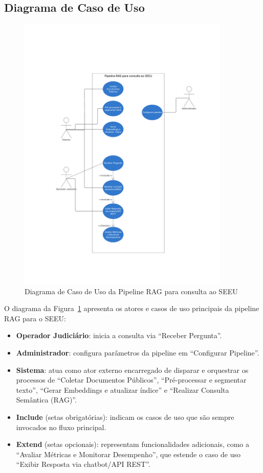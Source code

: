 \begin{description}
\section{Diagrama de Caso de Uso}
\label{sec:diagrama-caso-uso}

\begin{figure}[H]
  \centering
  \includegraphics[width=0.9\textwidth]{04-figuras/diagrama_em_branco.pdf}
  \caption{Diagrama de Caso de Uso da Pipeline RAG para consulta ao SEEU}
  \label{fig:diagrama-rag-seeu}
\end{figure}

\noindent
O diagrama da Figura~\ref{fig:diagrama-rag-seeu} apresenta os atores e casos de uso principais da pipeline RAG para o SEEU:  
\begin{itemize}
  \item \textbf{Operador Judiciário}: inicia a consulta via “Receber Pergunta”.  
  \item \textbf{Administrador}: configura parâmetros da pipeline em “Configurar Pipeline”.  
  \item \textbf{Sistema}: atua como ator externo encarregado de disparar e orquestrar os processos de “Coletar Documentos Públicos”, “Pré-processar e segmentar texto”, “Gerar Embeddings e atualizar índice” e “Realizar Consulta Semântica (RAG)”.  
  \item \textbf{Include} (setas obrigatórias): indicam os casos de uso que são sempre invocados no fluxo principal.  
  \item \textbf{Extend} (setas opcionais): representam funcionalidades adicionais, como a “Avaliar Métricas e Monitorar Desempenho”, que estende o caso de uso “Exibir Resposta via chatbot/API REST”.  
\end{itemize}  



\end{description}
